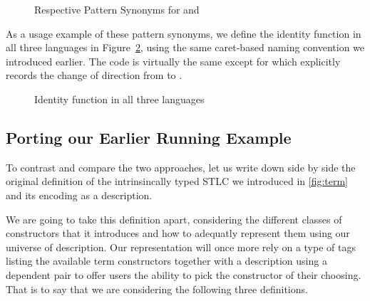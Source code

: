 \begin{figure}[h]
  \begin{AgdaSuppressSpace}
  \end{AgdaSuppressSpace}
  \caption{Respective Pattern Synonyms for  and %
    \label{fig:patsLC}}
\end{figure}

As a usage example of these pattern synonyms, we define the identity
function in all three languages in Figure~\ref{fig:identity}, using the
same caret-based naming convention we introduced earlier. The code
is virtually the same except for  which explicitly records
the change of direction from  to .

\begin{figure}[h]
\begin{minipage}{0.25\textwidth}
\end{minipage}\hfill
\begin{minipage}{0.35\textwidth}
\end{minipage}\hfill
\begin{minipage}{0.30\textwidth}
\end{minipage}
\caption{Identity function in all three languages}\label{fig:identity}
\end{figure}

\subsection{Porting our Earlier Running Example}

To contrast and compare the two approaches, let us write down side by side
the original definition of the intrinsincally typed STLC we introduced in
\cref{fig:term} and its encoding as a description.

We are going to take this definition apart, considering the different
classes of constructors that it introduces and how to adequatly represent
them using our universe of description. Our representation will once more
rely on a type  of tags listing the available term constructors
together with a description  using a dependent pair to offer users
the ability to pick the constructor of their choosing. That is to say that
we are considering the following three definitions.


